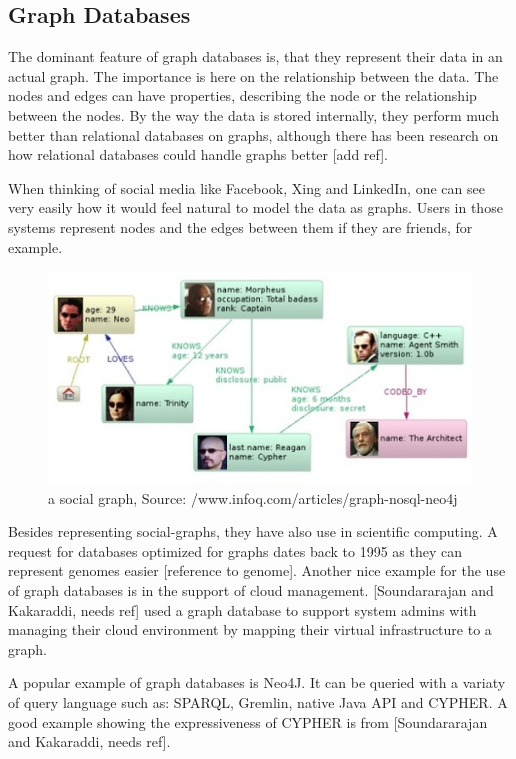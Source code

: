 \documentclass{acm_proc_article-sp}
\begin{document}
\subsection{Graph Databases}

The dominant feature of graph databases is, that they represent their data in an actual graph. The importance is here on the relationship between the data. The nodes and edges can have properties, describing the node or the relationship between the nodes. By the way the data is stored internally, they perform much better than relational databases on graphs, although there has been research on how relational databases could handle graphs better [add ref].

When thinking of social media like Facebook, Xing and LinkedIn, one can see very easily how it would feel natural to model the data as graphs. Users in those systems represent nodes and the edges between them if they are friends, for example.

\begin{figure}[hbtp]
	\centering
	\includegraphics[scale=0.5]{neo4j.jpg}
	\caption{a social graph, Source: /www.infoq.com/articles/graph-nosql-neo4j}
\end{figure}

Besides representing social-graphs, they have also use in scientific computing. A request for databases optimized for graphs dates back to 1995 as they can represent genomes easier [reference to genome]. Another nice example for the use of graph databases is in the support of cloud management. [Soundararajan and Kakaraddi, needs ref] used a graph database to support system admins with managing their cloud environment by mapping their virtual infrastructure to a graph. 


A popular example of graph databases is Neo4J. It can be queried with a variaty of query language such as: SPARQL, Gremlin, native Java API and CYPHER. A good example showing the expressiveness of CYPHER is from [Soundararajan and Kakaraddi, needs ref].
\end{document}
